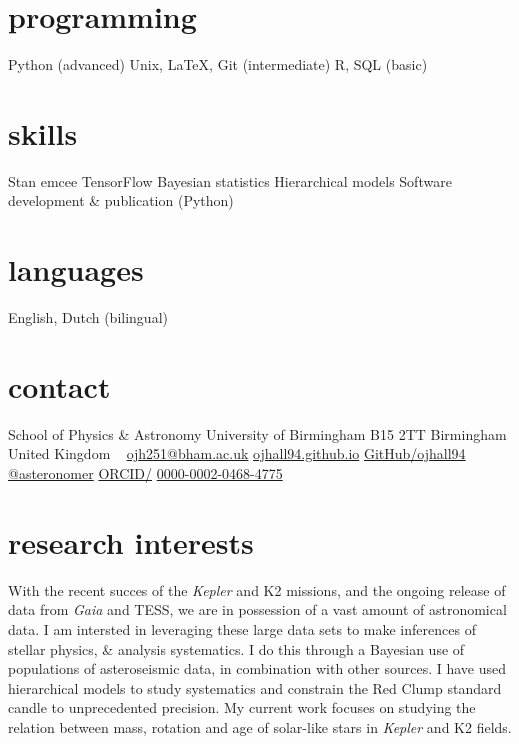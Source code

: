 \documentclass[]{k-cv} %
\begin{document}


\begin{aside} %
\section{programming}
Python (advanced)
Unix, LaTeX, Git (intermediate)
R, SQL (basic)
\section{skills}
Stan
emcee
TensorFlow
Bayesian statistics
Hierarchical models
Software development \& publication (Python)
\section{languages}
English, Dutch (bilingual)
\section{contact}
School of Physics \& Astronomy
University of Birmingham
B15 2TT
Birmingham
United Kingdom
~
\href{mailto:ojh251@student.bham.ac.uk}{ojh251@bham.ac.uk}
\href{http://www.ojhall94.github.io}{ojhall94.github.io}
\href{http://www.github.com/ojhall94}{GitHub/ojhall94}
\href{http://www.twitter.com/asteronomer}{@asteronomer}
\href{http://www.orcid.com/0000-0002-0468-4775}{ORCID/}
\href{http://www.orcid.com/0000-0002-0468-4775}{0000-0002-0468-4775}
\end{aside}

\section{research interests}
\bodyfont With the recent succes of the \textit{Kepler} and K2 missions, and the ongoing release of data from \textit{Gaia} and TESS, we are in possession of a vast amount of astronomical data. I am intersted in leveraging these large data sets to make inferences of stellar physics, \& analysis systematics. I do this through a Bayesian use of populations of asteroseismic data, in combination with other sources. I have used hierarchical models to study systematics and constrain the Red Clump standard candle to unprecedented precision. My current work focuses on studying the relation between mass, rotation and age of solar-like stars in \textit{Kepler} and K2 fields.
\end{document}
